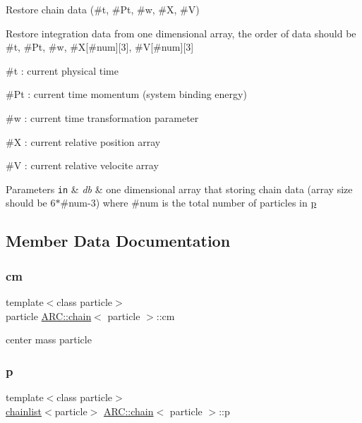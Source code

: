 Restore chain data (\#t, \#\+Pt, \#w, \#X, \#V) 

Restore integration data from one dimensional array, the order of data should be \#t, \#\+Pt, \#w, \#X\mbox{[}\#num\mbox{]}\mbox{[}3\mbox{]}, \#V\mbox{[}\#num\mbox{]}\mbox{[}3\mbox{]}
\begin{DoxyItemize}
\item \#t \+: current physical time
\item \#\+Pt \+: current time momentum (system binding energy)
\item \#w \+: current time transformation parameter
\item \#X \+: current relative position array
\item \#V \+: current relative velocite array 
\begin{DoxyParams}[1]{Parameters}
\mbox{\tt in}  & {\em db} & one dimensional array that storing chain data (array size should be 6$\ast$\#num-\/3) where \#num is the total number of particles in \hyperlink{classARC_1_1chain_af1793b656e139e1f87c2e0a55f87514b}{p} \\
\hline
\end{DoxyParams}

\end{DoxyItemize}

\subsection{Member Data Documentation}
\hypertarget{classARC_1_1chain_ae9f6a5cbf7aac2b33c7274e7e10916ed}{}\label{classARC_1_1chain_ae9f6a5cbf7aac2b33c7274e7e10916ed} 
\subsubsection{\texorpdfstring{cm}{cm}}
{\footnotesize\ttfamily template$<$class particle$>$ \\
particle \hyperlink{classARC_1_1chain}{A\+R\+C\+::chain}$<$ particle $>$\+::cm}



center mass particle 

\hypertarget{classARC_1_1chain_af1793b656e139e1f87c2e0a55f87514b}{}\label{classARC_1_1chain_af1793b656e139e1f87c2e0a55f87514b} 
\subsubsection{\texorpdfstring{p}{p}}
{\footnotesize\ttfamily template$<$class particle$>$ \\
\hyperlink{classARC_1_1chainlist}{chainlist}$<$particle$>$ \hyperlink{classARC_1_1chain}{A\+R\+C\+::chain}$<$ particle $>$\+::p}



